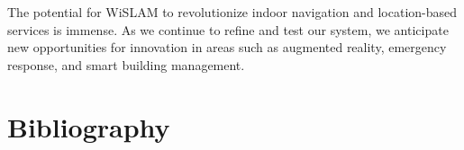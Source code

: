 \documentclass[
	a4paper, %
	11pt, %
	unnumberedsections, %
	twoside, %
]{LTJournalArticle}
\begin{document}
The potential for WiSLAM to revolutionize indoor navigation and location-based services is immense. As we continue to refine and test our system, we anticipate new opportunities for innovation in areas such as augmented reality, emergency response, and smart building management.

\section{Bibliography}


\printbibliography %

\end{document}
